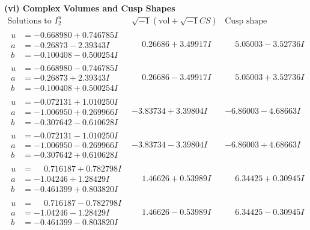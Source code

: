 \documentclass[1p]{elsarticle_modified}
\theoremstyle{definition}
\newcommand{\I}{\sqrt{-1}}
\begin{document}
\newpage\flushleft \textbf{(vi) Complex Volumes and Cusp Shapes}
$$\begin{array}{c|c|c}  
\text{Solutions to }I^u_{2}& \I (\text{vol} + \sqrt{-1}CS) & \text{Cusp shape}\\
 \hline 
\begin{aligned}
u &= -0.668980 + 0.746785 I \\
a &= -0.26873 - 2.39343 I \\
b &= -0.100408 - 0.500254 I\end{aligned}
 & \phantom{-}0.26686 + 3.49917 I & \phantom{-}5.05003 - 3.52736 I \\ \hline\begin{aligned}
u &= -0.668980 - 0.746785 I \\
a &= -0.26873 + 2.39343 I \\
b &= -0.100408 + 0.500254 I\end{aligned}
 & \phantom{-}0.26686 - 3.49917 I & \phantom{-}5.05003 + 3.52736 I \\ \hline\begin{aligned}
u &= -0.072131 + 1.010250 I \\
a &= -1.006950 + 0.269966 I \\
b &= -0.307642 - 0.610628 I\end{aligned}
 & -3.83734 + 3.39804 I & -6.86003 - 4.68663 I \\ \hline\begin{aligned}
u &= -0.072131 - 1.010250 I \\
a &= -1.006950 - 0.269966 I \\
b &= -0.307642 + 0.610628 I\end{aligned}
 & -3.83734 - 3.39804 I & -6.86003 + 4.68663 I \\ \hline\begin{aligned}
u &= \phantom{-}0.716187 + 0.782798 I \\
a &= -1.04246 + 1.28429 I \\
b &= -0.461399 + 0.803820 I\end{aligned}
 & \phantom{-}1.46626 + 0.53989 I & \phantom{-}6.34425 + 0.30945 I \\ \hline\begin{aligned}
u &= \phantom{-}0.716187 - 0.782798 I \\
a &= -1.04246 - 1.28429 I \\
b &= -0.461399 - 0.803820 I\end{aligned}
 & \phantom{-}1.46626 - 0.53989 I & \phantom{-}6.34425 - 0.30945 I \\ \hline\begin{aligned}

\end{aligned}
\end{array}$$
\end{document}
